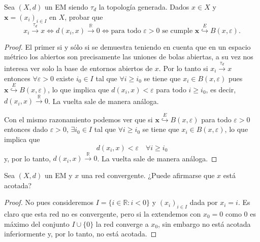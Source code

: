 \documentclass{article}
\theoremstyle{plain}
\theoremstyle{definition}
\newcommand{\R}{\mathbb{R}}
\newcommand{\evto}[1]{\stackrel{E}{\hookrightarrow} #1}   %
\newenvironment{ejercicio}[1]{\begin{trivlist}
\item[\hskip \labelsep {\bfseries Ejercicio}\hskip \labelsep {\bfseries #1.}]}{\end{trivlist}}
\begin{document}
\begin{ejercicio}{6}
    Sea \( (X, d) \) un EM siendo \( \tau_d \) la topología generada. Dados \( x \in X \) y \( \mathbf{x} = {(x_i)}_{i \in I} \) en \( X \), probar que
    \[
        x_i \xrightarrow{\tau_d} x \iff d(x_i, x) \xrightarrow{\R} 0 \iff \text{para todo } \varepsilon > 0 \text{ se cumple } \mathbf{x} \evto{B(x, \varepsilon)}.
    \]
\end{ejercicio}
\begin{proof}
    El primer si y sólo si se demuestra teniendo en cuenta que en un espacio métrico los abiertos son precisamente las uniones de bolas abiertas, a su vez
    nos interesa ver solo la base de entornos abiertos de \( x \).
    Por lo tanto si \( x_i \xrightarrow{\tau_d} x \) entonces \( \forall \varepsilon > 0 \) existe \( i_0 \in I \) tal que
    \( \forall i \geq i_0 \) se tiene que \( x_i \in B(x, \varepsilon) \) pues \( \mathbf{x} \evto{B(x, \varepsilon)} \), lo que implica que \( d(x_i, x) < \varepsilon \) para todo \( i \geq i_0 \), es decir,
    \( d(x_i, x) \xrightarrow{\R} 0 \). La vuelta sale de manera análoga.

    Con el mismo razonamiento podemos ver que si \( \mathbf{x} \evto{B(x, \varepsilon)} \) para todo \( \varepsilon > 0 \) entonces dado \( \varepsilon > 0 \),
    \( \exists i_0 \in I \) tal que \( \forall i \geq i_0 \) se tiene que \( x_i \in B(x, \varepsilon) \), lo que implica que \[
        d(x_i, x) < \varepsilon \quad \forall i \geq i_0
    \]
    y, por lo tanto, \( d(x_i, x) \xrightarrow{\R} 0 \). La vuelta sale de manera análoga.
\end{proof}

\begin{ejercicio}{7}
    Sea \( (X, d) \) un EM y \( x \) una red convergente. ¿Puede afirmarse que \( x \) está acotada?
\end{ejercicio}
\begin{proof}
    No pues consideremos \( I = \{ i \in \R : i < 0 \} \) y \( {(x_i)}_{i \in I} \) dada por \( x_i = i \). Es claro que esta red no es convergente, pero si la extendemos con \( x_0 = 0 \) como \( 0 \) es máximo
    del conjunto \( I \cup \{ 0 \} \) la red converge a \( x_0 \), sin embargo no está acotada inferiormente y, por lo tanto, no está acotada.
\end{proof}
\end{document}
